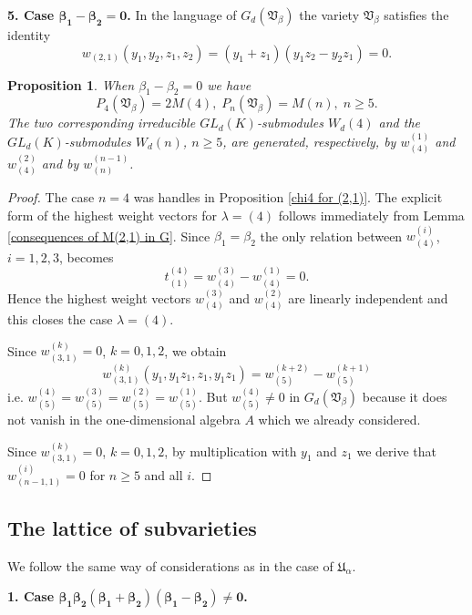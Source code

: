 \documentclass{amsart}
\newtheorem{proposition}[theorem]{Proposition}
\theoremstyle{definition}
\begin{document}
{\bf 5. Case $\bm{\beta_1-\beta_2=0}$.} In the language of $G_d({\mathfrak V}_{\beta})$ the variety ${\mathfrak V}_{\beta}$ satisfies the identity
\[
w_{(2,1)}(y_1,y_2,z_1,z_2)=(y_1+z_1)(y_1z_2-y_2z_1)=0.
\]

\begin{proposition}\label{chi for beta1=beta2}
When $\beta_1-\beta_2=0$ we have
\[
P_4({\mathfrak V}_{\beta})=2M(4),\;
P_n({\mathfrak V}_{\beta})=M(n),\; n\geq 5.
\]
The two corresponding irreducible $GL_d(K)$-submodules $W_d(4)$ and the $GL_d(K)$-submodules $W_d(n)$, $n\geq 5$, are generated, respectively, by
$w_{(4)}^{(1)}$ and $w_{(4)}^{(2)}$ and by $w_{(n)}^{(n-1)}$.
\end{proposition}

\begin{proof}
The case $n=4$ was handles in Proposition \ref{chi4 for (2,1)}. The explicit form of the highest weight vectors for $\lambda=(4)$ follows immediately
from Lemma \ref{consequences of M(2,1) in G}.
Since $\beta_1=\beta_2$ the only relation between $w_{(4)}^{(i)}$, $i=1,2,3$, becomes
\[
t^{(4)}_{(1)}=w_{(4)}^{(3)}-w_{(4)}^{(1)}=0.
\]
Hence the highest weight vectors $w_{(4)}^{(3)}$ and $w_{(4)}^{(2)}$ are linearly independent and this closes the case $\lambda=(4)$.

Since $w_{(3,1)}^{(k)}=0$, $k=0,1,2$, we obtain
\[
w_{(3,1)}^{(k)}(y_1,y_1z_1,z_1,y_1z_1)=w_{(5)}^{(k+2)}-w_{(5)}^{(k+1)}
\]
i.e. $w_{(5)}^{(4)}=w_{(5)}^{(3)}=w_{(5)}^{(2)}=w_{(5)}^{(1)}$. But $w_{(5)}^{(4)}\not=0$ in $G_d({\mathfrak V}_{\beta})$ because
it does not vanish in the one-dimensional algebra $A$ which we already considered.

Since $w_{(3,1)}^{(k)}=0$, $k=0,1,2$, by multiplication with $y_1$ and $z_1$ we derive that $w_{(n-1,1)}^{(i)}=0$ for $n\geq 5$ and all $i$.
\end{proof}


\subsection{The lattice of subvarieties}
We follow the same way of considerations as in the case of ${\mathfrak U}_{\alpha}$.

{\bf 1. Case $\bm{\beta_1\beta_2(\beta_1+\beta_2)(\beta_1-\beta_2)\not=0}$.}
\end{document}
